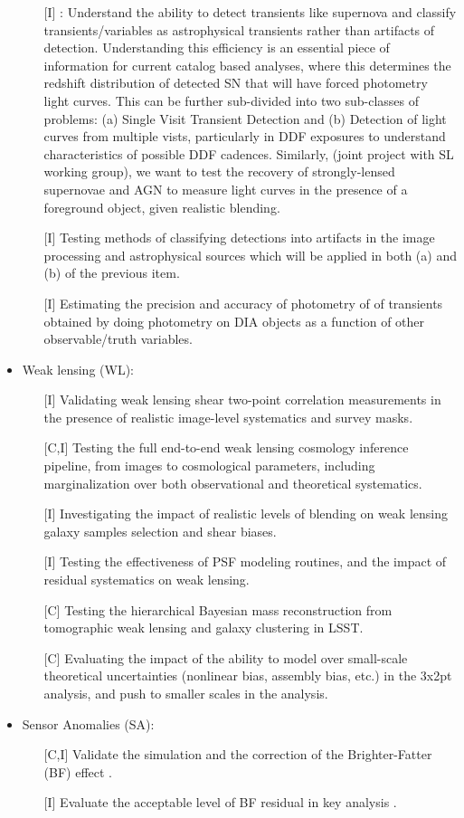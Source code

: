 \documentclass[preprint,times]{aastex61}
\begin{document}
\begin{itemize}
\begin{enumerate}
\item[{[I]}] : Understand the ability to detect transients like supernova and classify transients/variables as astrophysical transients rather than artifacts of detection. Understanding this efficiency is an essential piece of information for current catalog based analyses, where this determines the redshift distribution of detected SN that will have forced photometry light curves. This can be further sub-divided into two sub-classes of problems: (a) Single Visit Transient Detection  and (b) Detection of light curves from multiple vists, particularly in DDF exposures to understand characteristics of possible DDF cadences. Similarly, (joint project with SL working group), we want to test the recovery of strongly-lensed supernovae and AGN to measure light curves in the presence of a foreground object, given realistic blending. 
\item[{[I]}] Testing methods of classifying detections into artifacts in the image processing and astrophysical sources which will be applied in both (a) and (b) of the previous item.
\item[{[I]}] Estimating the precision and accuracy of photometry of of transients obtained by doing photometry on DIA objects as a function of other observable/truth variables.
\end{enumerate}
\item Weak lensing (WL):
\begin{enumerate}
\item[{[I]}] Validating weak lensing shear two-point correlation measurements in the presence of realistic image-level systematics and survey masks.
\item[{[C,I]}] Testing the full end-to-end weak lensing cosmology inference pipeline, from images to cosmological parameters, including marginalization over both observational and theoretical systematics.
\item[{[I]}] Investigating the impact of realistic levels of blending on weak lensing galaxy samples selection and shear biases.
\item[{[I]}] Testing the effectiveness of PSF modeling routines, and the impact of residual systematics on weak lensing.
\item[{[C]}] Testing the hierarchical Bayesian mass reconstruction from tomographic weak lensing and galaxy clustering in LSST.
\item[{[C]}] Evaluating the impact of the ability to model over small-scale theoretical uncertainties (nonlinear bias, assembly bias, etc.) in the 3x2pt analysis, and push to smaller scales in the analysis.
\end{enumerate}
\item Sensor Anomalies (SA):
\begin{enumerate}
\item[{[C,I]}] Validate the simulation and the  correction of the Brighter-Fatter (BF)  effect .
\item[{[I]}]  Evaluate the acceptable level of  BF residual in key analysis . 
\end{enumerate}
\end{itemize}
\end{document}
